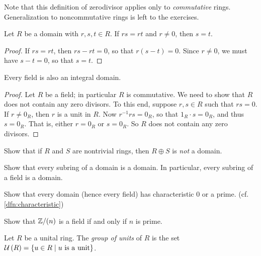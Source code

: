 Note that this definition of zerodivisor applies only to \emph{commutative} rings. Generalization to noncommutative rings is left to the exercises.

\begin{prop}[Cancellation] \label{prop:cancellation}
Let \(R\) be a domain with \(r,s,t \in R\). If \(rs = rt\) and \(r \neq 0\), then \(s = t\).
\end{prop}

\begin{proof}
If \(rs = rt\), then \(rs - rt = 0\), so that \(r(s-t) = 0\). Since \(r \neq 0\), we must have \(s-t = 0\), so that \(s = t\).
\end{proof}


\begin{prop}
Every field is also an integral domain.
\end{prop}

\begin{proof}
Let \(R\) be a field; in particular \(R\) is commutative. We need to show that \(R\) does not contain any zero divisors. To this end, suppose \(r,s \in R\) such that \(rs = 0\). If \(r \neq 0_R\), then \(r\) is a unit in \(R\). Now \(r^{-1}rs = 0_R\), so that \(1_R \cdot s = 0_R\), and thus \(s = 0_R\). That is, either \(r = 0_R\) or \(s = 0_R\). So \(R\) does not contain any zero divisors.
\end{proof}



\Exercises%

\begin{exercise}
Show that if \(R\) and \(S\) are nontrivial rings, then \(R \oplus S\) is \emph{not} a domain.
\end{exercise}

\begin{exercise}
Show that every subring of a domain is a domain. In particular, every subring of a field is a domain.
\end{exercise}

\begin{exercise}
Show that every domain (hence every field) has characteristic 0 or a prime. (cf. \ref{dfn:characteristic})
\end{exercise}

\begin{exercise}
Show that \(\mathbb{Z}/(n)\) is a field if and only if \(n\) is prime.
\end{exercise}

\begin{dfn}
Let \(R\) be a unital ring. The \emph{group of units} of \(R\) is the set \(\UNITS{R} = \{ u \in R \mid u\ \mathrm{is\ a\ unit} \}\).
\end{dfn}

